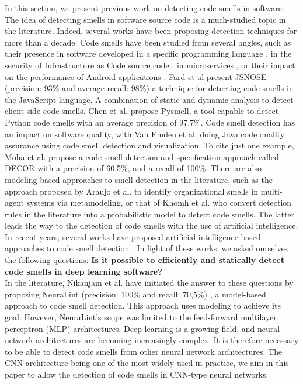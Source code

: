 \label{sec:background}
In this section, we present previous work on detecting code smells in software.\\

The idea of detecting smells in software source code is a much-studied topic in
the literature. Indeed, several works have been proposing detection techniques
for more than a decade. Code smells have been studied from several angles, such
as their presence in software developed in a specific programming language
\cite{saboury2017empirical}, in the security of Infrastructure as Code source
code \cite{rahman2021security}, in microservices \cite{cernymicroservice}, or
their impact on the performance of Android applications
\cite{hecht2016empirical}. Fard et al \cite{6648192} present JSNOSE (precision:
93\% and average recall: 98\%) a technique for detecting code smells in the
JavaScript language. A combination of static and dynamic analysis to detect
client-side code smells. Chen et al. \cite{chen2016detecting} propose Pysmell, a
tool capable to detect Python code smells with an average precision of 97.7\%.
Code smell detection has an impact on software quality, with Van Emden et al.
\cite{1173068} doing Java code quality assurance using code smell detection and
visualization. To cite just one example, Moha et al. \cite{moha2010decor}
propose a code smell detection and specification approach called DECOR with a
precision of 60.5\%, and a recall of 100\%. There are also modeling-based
approaches to smell detection in the literature, such as the approach proposed
by Araujo et al. \cite{araujo2018metamodeling} to identify organizational smells
in multi-agent systems via metamodeling, or that of Khomh et al.
\cite{khomh2009bayesian} who convert detection rules in the literature into a
probabilistic model to detect code smells. The latter leads the way to the
detection of code smells with the use of artificial intelligence. In recent
years, several works have proposed artificial intelligence-based approaches to
code smell detection \cite{alawadi2023fedcsd, sandouka2023python, alazba2023deep}. In
light of these works, we asked ourselves the following questions: \textbf{Is it
    possible to efficiently and statically detect code smells in deep learning
    software?} \\In the literature, Nikanjam et al. have initiated the answer to
these questions by proposing NeuraLint (precision: 100\% and recall: 70,5\%)
\cite{nikanjam2021automatic}, a model-based approach to code smell detection.
This approach uses modeling to achieve its goal. However, NeuraLint's scope was
limited to the feed-forward multilayer perceptron (MLP) architectures. Deep
learning is a growing field, and neural network architectures are becoming
increasingly complex. It is therefore necessary to be able to detect code smells
from other neural network architectures. The CNN architecture being one of the
most widely used in practice, we aim in this paper to allow the detection of
code smells in CNN-type neural networks.










